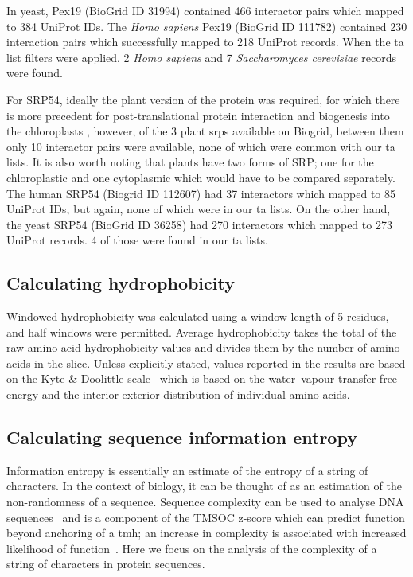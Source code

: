 In yeast, Pex19 (BioGrid ID 31994) contained 466 interactor pairs which mapped to 384 UniProt IDs.
The \textit{Homo sapiens} Pex19 (BioGrid ID 111782) contained 230 interaction pairs which successfully mapped to 218 UniProt records.
When the \gls{ta} list filters were applied, 2 \textit{Homo sapiens} and 7 \textit{Saccharomyces cerevisiae} records were found.

For SRP54, ideally the plant version of the protein was required, for which there is more precedent for post\--translational protein interaction and biogenesis into the chloroplasts \cite{Abell2004}, however, of the 3 plant \gls{srp}s available on Biogrid, between them only 10 interactor pairs were available, none of which were common with our \gls{ta} lists.
It is also worth noting that plants have two forms of SRP; one for the chloroplastic and one cytoplasmic which would have to be compared separately.
The human SRP54 (Biogrid ID 112607) had 37 interactors which mapped to 85 UniProt IDs, but again, none of which were in our \gls{ta} lists.
On the other hand, the yeast SRP54 (BioGrid ID 36258) had 270 interactors which mapped to 273 UniProt records.
4 of those were found in our \gls{ta} lists.

\subsection{Calculating hydrophobicity}
Windowed hydrophobicity was calculated using a window length of 5 residues, and half windows were permitted.
Average hydrophobicity takes the total of the raw amino acid hydrophobicity values and divides them by the number of amino acids in the slice.
Unless explicitly stated, values reported in the results are based on the Kyte \& Doolittle scale~\cite{Kyte1982} which is based on the water\---vapour transfer free energy and the interior-exterior distribution of individual amino acids.

\subsection{Calculating sequence information entropy}
Information entropy is essentially an estimate of the entropy of a string of characters.
In the context of biology, it can be thought of as an estimation of the non\--randomness of a sequence.
Sequence complexity can be used to analyse DNA sequences~\cite{Pinho2013, Oliver1993, Troyanskaya2002} and is a component of the TMSOC z-score which can predict function beyond anchoring of a \gls{tmh}; an increase in complexity is associated with increased likelihood of function~\cite{Wong2011, Wong2012, Baker2017}.
Here we focus on the analysis of the complexity of a string of characters in protein sequences.

